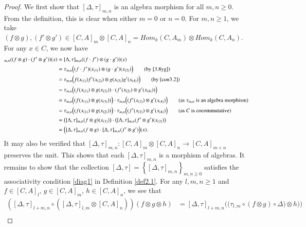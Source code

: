 \documentclass[10pt, colorlinks]{article}
\numberwithin{equation}{section} \DeclareMathSizes{2}{10}{12}{13}
\begin{document}
    \begin{proof}
       We first show that $[\Delta,\tau]_{m,n}$ is an algebra morphism for all $m,n\geq 0$. From the definition, this is clear when either $m=0$ or $n=0$.  For $m,n\geq 1$, we take $(f\otimes g),(f'\otimes g')\in [C,A]_m\otimes [C,A]_n=  {Hom}_k(C,A_m)\otimes  {Hom}_k(C,A_n) $. For any $x\in C$, we now have
        \begin{align*}
            [\Delta,\tau]_{m,n}((f\otimes g)\cdot (f'\otimes g'))(x)
            &=[\Delta,\tau]_{m,n}((f\cdot f')\otimes (g\cdot g'))(x)\\
            &=\tau_{m,n}\Big( (f\cdot f')(x_{(1)})\otimes (g\cdot g')(x_{(2)})\Big)\tag{by \eqref{3.8yg}}\\
            &=\tau_{m,n}\Big(f(x_{(1)})f'(x_{(2)})\otimes g(x_{(3)})g'(x_{(4)})\Big)\tag{by \eqref{con3.2}}\\
            &=\tau_{m,n}\Big((f(x_{(1)})\otimes g(x_{(3)}))\cdot (f'(x_{(2)})\otimes g'(x_{(4)}))\Big)\\
            &=\tau_{m,n}\Big((f(x_{(1)})\otimes g(x_{(3)}))\Big)\cdot  \tau_{m,n}\Big((f'(x_{(2)})\otimes g'(x_{(4)})\Big)\tag{as $\tau_{m,n}$ is an algebra morphism}\\
            &=\tau_{m,n}\Big((f(x_{(1)})\otimes g(x_{(2)}))\Big)\cdot  \tau_{m,n}\Big((f'(x_{(3)})\otimes g'(x_{(4)})\Big) \tag{as $C$ is cocommutative}\\
            &=\left([\Delta,\tau]_{m,n}(f\otimes g)(x_{(1)})\right)\cdot  \left([\Delta,\tau]_{m,n}(f'\otimes g')(x_{(2)})\right) \\
            &=\Big([\Delta,\tau]_{m,n}(f\otimes g)\cdot [\Delta,\tau]_{m,n}(f'\otimes g')\Big)(x).
        \end{align*}
        It may also be verified that  $[\Delta,\tau]_{m,n}: [C,A]_m\otimes  [C,A]_n\longrightarrow [C,A]_{m+n} $ preserves the unit. This shows that 
        each $[\Delta,\tau]_{m,n}$ is a morphism of algebras.  It remains to show that   the collection 
        $[\Delta,\tau]=\left\{[\Delta,\tau]_{m,n}\right\}_{m,n\geq 0}$ satisfies the associativity condition \eqref{diag1} in Definition \ref{def2.1}. For any $l,m,n\geq 1$ and $f\in [C,A]_l$, 
        $g\in [C,A]_m$, $h\in [C,A]_n$, we  see that
        \begin{align*}
           \left( [\Delta,\tau]_{l+m,n}\circ\left([\Delta,\tau]_{l,m}\otimes  [C, A]_n\right)\right) (f\otimes g\otimes h)
            &=[\Delta,\tau]_{l+m,n}\Big(\big(\tau_{l,m}\circ(f\otimes g)\circ \Delta \big)\otimes h)\Big)\\

\end{align*}
\end{proof}
\end{document}
